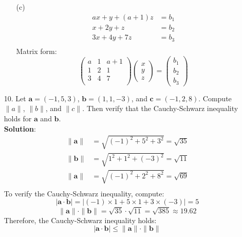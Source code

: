 \documentclass{article}
\begin{document}
\begin{enumerate}
\begin{enumerate}
            \item[(c)] 
            \begin{align*}
                ax + y + (a + 1)z &= b_1 \\
                x + 2y + z        &= b_2 \\
                3x + 4y + 7z      &= b_3 \\
            \end{align*}
            Matrix form:
            \begin{equation*}
                \begin{pmatrix}
                    a &1 &a+1 \\
                    1 &2 &1   \\
                    3 &4 &7   \\
                \end{pmatrix}
                \begin{pmatrix}x\\y\\z\end{pmatrix}
                = \begin{pmatrix}b_1\\b_2\\b_3\end{pmatrix}
            \end{equation*}
            
        \end{enumerate}
        
    \item[10. ] Let $\mathbf{a} = (-1,5,3)$, $\mathbf{b} = (1,1,-3)$, and $\mathbf{c}=(-1,2,8)$. Compute $\|a\|$, $\|b\|$, and $\|c\|$. Then verify that the Cauchy-Schwarz inequality holds for $\mathbf{a}$ and $\mathbf{b}$. \\
    
    \textbf{Solution}: 
    \begin{align*}
        \|\mathbf{a}\| &= \sqrt{(-1)^2 + 5^2 + 3^2} = \sqrt{35} \\
        \|\mathbf{b}\| &= \sqrt{1^2 + 1^2 + (-3)^2} = \sqrt{11} \\
        \|\mathbf{a}\| &= \sqrt{(-1)^2 + 2^2 + 8^2} = \sqrt{69} \\
    \end{align*}
    To verify the Cauchy-Schwarz inequality, compute:
    $$ | \mathbf{a} \cdot \mathbf{b} | = | (-1) \times 1 + 5 \times 1 + 3 \times (-3) | = 5 $$
    $$ \|\mathbf{a}\| \cdot \|\mathbf{b}\| = \sqrt{35} \cdot \sqrt{11} = \sqrt{385} \approx 19.62 $$
    Therefore, the Cauchy-Schwarz inequality holds:
    $$ | \mathbf{a} \cdot \mathbf{b} | \leq \|\mathbf{a}\| \cdot \|\mathbf{b}\| $$
    
\end{enumerate}
\end{document}
